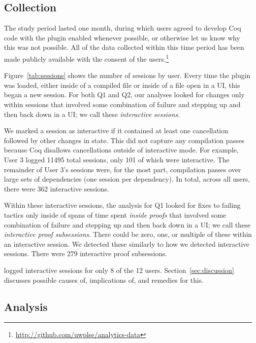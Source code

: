 \subsection{Collection}
\label{sec:collection}

The study period lasted one month, during which users agreed to develop
Coq code with the plugin enabled whenever possible, or otherwise let us know
why this was not possible.
All of the data collected within this time period
has been made publicly available with the consent of the users.\footnote{\url{http://github.com/uwplse/analytics-data}}

Figure~\ref{tab:sessions} shows the number of sessions by user.
Every time the plugin was loaded, either inside of a compiled file
or inside of a file open in a UI, this began a new session.
For both Q1 and Q2, our analyses looked for changes only within
sessions that involved some combination of failure
and stepping up and then back down in a UI;
we call these \textit{interactive sessions}.

We marked a session as interactive if it contained at least
one cancellation followed by other changes in
state. This did not capture any compilation passes
because Coq disallows cancellations outside of interactive mode.
For example, User 3 logged 11495 total sessions, only 101
of which were interactive. 
The remainder of User 3's sessions were, for the most part,
compilation passes over large sets of dependencies (one session per dependency).
In total, across all users, there were 362 interactive sessions.

Within these interactive sessions, the analysis for Q1 looked for 
fixes to failing tactics only inside of spans of time spent 
\emph{inside proofs} that involved some combination of failure and
stepping up and then back down in a UI;
we call these \textit{interactive proof subsessions}.
There could be zero, one, or multiple of these within an interactive session.
We detected these similarly to how we detected
interactive sessions.
There were 279 interactive proof subsessions.

\toolname logged interactive sessions for only 8 of the 12 users.
Section~\ref{sec:discussion} discusses possible causes of, implications of,
and remedies for this.

\subsection{Analysis}
\label{sec:analysis}

